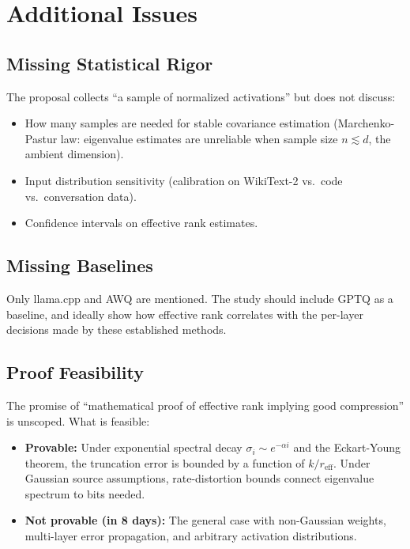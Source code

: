 \documentclass[11pt,a4paper]{article}
\begin{document}
\section{Additional Issues}

\subsection{Missing Statistical Rigor}
The proposal collects ``a sample of normalized activations'' but does not discuss:
\begin{itemize}
    \item How many samples are needed for stable covariance estimation (Marchenko-Pastur law: eigenvalue estimates are unreliable when sample size $n \lesssim d$, the ambient dimension).
    \item Input distribution sensitivity (calibration on WikiText-2 vs.\ code vs.\ conversation data).
    \item Confidence intervals on effective rank estimates.
\end{itemize}

\subsection{Missing Baselines}
Only llama.cpp and AWQ are mentioned. The study should include GPTQ as a baseline, and ideally show how effective rank correlates with the per-layer decisions made by these established methods.

\subsection{Proof Feasibility}
The promise of ``mathematical proof of effective rank implying good compression'' is unscoped. What is feasible:
\begin{itemize}
    \item \textbf{Provable:} Under exponential spectral decay $\sigma_i \sim e^{-\alpha i}$ and the Eckart-Young theorem, the truncation error is bounded by a function of $k/r_{\text{eff}}$. Under Gaussian source assumptions, rate-distortion bounds connect eigenvalue spectrum to bits needed.
    \item \textbf{Not provable (in 8 days):} The general case with non-Gaussian weights, multi-layer error propagation, and arbitrary activation distributions.
\end{itemize}
\end{document}
